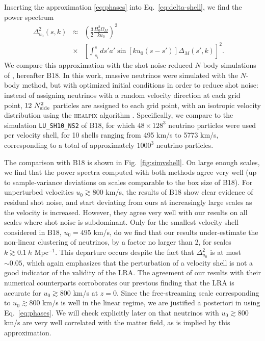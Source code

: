 \documentclass[useAMS, usenatbib]{mnras}
\newcommand{\barr}{\begin{eqnarray}}
\newcommand{\earr}{\end{eqnarray}}
\begin{document}
Inserting the approximation \eqref{eq:phases} into Eq.~\eqref{eq:delta-shell}, we find the power spectrum
\barr
\Delta^2_{u_0}(s, k)&\approx& \left(\frac32 \frac{H_0^2 \Omega_M}{k u_0}\right)^2\nonumber\\
&\times& \left[\int_{s_i}^s ds' a' \sin[k u_0 (s - s')] \Delta_M(s', k) \right]^2. ~~~~~
\earr
We compare this approximation with the shot noise reduced $N$-body simulations of \cite{Banerjee_2018}, hereafter B18. In this work, massive neutrinos were simulated with the $N$-body method, but with optimized initial conditions in order to reduce shot noise: instead of assigning neutrinos with a random velocity direction at each grid point, $12 ~N_{\rm side}^2$ particles are assigned to each grid point, with an isotropic velocity distribution using the \textsc{healpix} algorithm \citep{Healpix}. Specifically, we compare to the simulation \texttt{LU\_SH10\_NS2} of B18, for which $48 \times 128^3$ neutrino particles were used per velocity shell, for 10 shells ranging from 495 km/s to 5773 km/s, corresponding to a total of approximately $1000^3$ neutrino particles.

The comparison with B18 is shown in Fig.~\ref{fig:simvshell}. On large enough scales, we find that the power spectra computed with both methods agree very well (up to sample-variance deviations on scales comparable to the box size of B18). For unperturbed velocities $u_0 \gtrsim 800$ km/s, the results of B18 show clear evidence of residual shot noise, and start deviating from ours at increasingly large scales as the velocity is increased. However, they agree very well with our results on all scales where shot noise is subdominant. Only for the smallest velocity shell considered in B18, $u_0 = 495$ km/s, do we find that our results under-estimate the non-linear clustering of neutrinos, by a factor no larger than 2, for scales $k \gtrsim 0.1~h$ Mpc$^{-1}$. This departure occurs despite the fact that $\Delta^2_{u_0}$ is at most $\sim 0.05$, which again emphasizes that the perturbation of a velocity shell is not a good indicator of the validity of the LRA.
The agreement of our results with their numerical counterparts corroborates our previous finding that the LRA is accurate for $u_0 \gtrsim 800$ km/s at $z = 0$. Since the free-streaming scale corresponding to $u_0 \gtrsim 800$ km/s is well in the linear regime, we are justified a posteriori in using Eq.~\eqref{eq:phases}. We will check explicitly later on that neutrinos with $u_0 \gtrsim 800$ km/s are very well correlated with the matter field, as is implied by this approximation.
\end{document}
